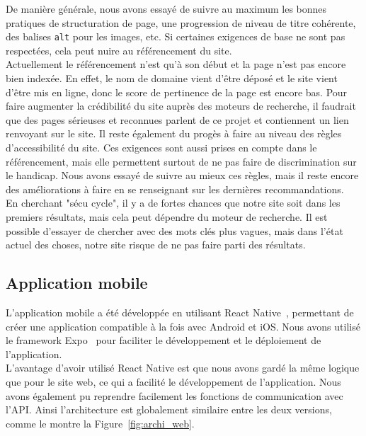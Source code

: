 \noindent De manière générale, nous avons essayé de suivre au maximum les bonnes pratiques de structuration de page, une progression de niveau de titre cohérente, des balises \texttt{alt} pour les images, etc. Si certaines exigences de base ne sont pas respectées, cela peut nuire au référencement du site.\\

\noindent Actuellement le référencement n'est qu'à son début et la page n'est pas encore bien indexée. En effet, le nom de domaine vient d'être déposé et le site vient d'être mis en ligne, donc le score de pertinence de la page est encore bas. Pour faire augmenter la crédibilité du site auprès des moteurs de recherche, il faudrait que des pages sérieuses et reconnues parlent de ce projet et contiennent un lien renvoyant sur le site. Il reste également du progès à faire au niveau des règles d'accessibilité du site. Ces exigences sont aussi prises en compte dans le référencement, mais elle permettent surtout de ne pas faire de discrimination sur le handicap. Nous avons essayé de suivre au mieux ces règles, mais il reste encore des améliorations à faire en se renseignant sur les dernières recommandations.\\

\noindent En cherchant "sécu cycle", il y a de fortes chances que notre site soit dans les premiers résultats, mais cela peut dépendre du moteur de recherche. Il est possible d'essayer de chercher avec des mots clés plus vagues, mais dans l'état actuel des choses, notre site risque de ne pas faire parti des résultats.\\

\subsection{Application mobile}
\label{sec:mobile}

\noindent L'application mobile a été développée en utilisant React Native~\cite{ReactNative}, permettant de créer une application compatible à la fois avec Android et iOS. Nous avons utilisé le framework Expo~\cite{Expo} pour faciliter le développement et le déploiement de l'application.\\

\noindent L'avantage d'avoir utilisé React Native est que nous avons gardé la même logique que pour le site web, ce qui a facilité le développement de l'application. Nous avons également pu reprendre facilement les fonctions de communication avec l'API. Ainsi l'architecture est globalement similaire entre les deux versions, comme le montre la Figure~\ref{fig:archi_web}.\\

